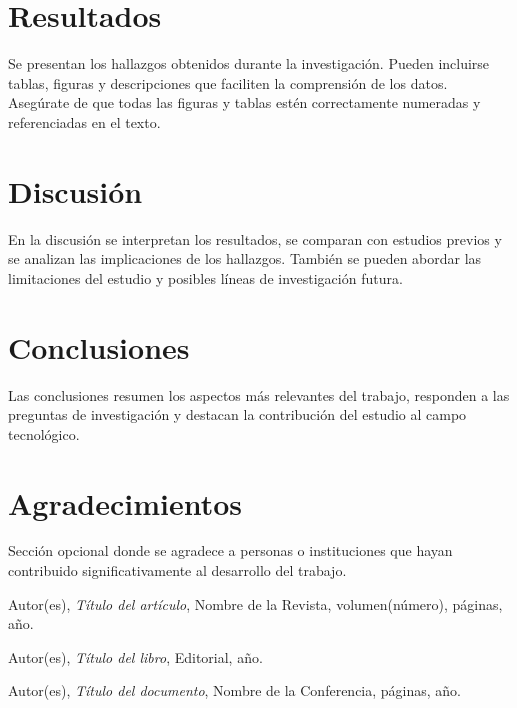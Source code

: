 \documentclass[a4paper,12pt]{article}
\begin{document}
\section{Resultados}
Se presentan los hallazgos obtenidos durante la investigación. Pueden incluirse tablas, figuras y descripciones que faciliten la comprensión de los datos. Asegúrate de que todas las figuras y tablas estén correctamente numeradas y referenciadas en el texto.

\section{Discusión}
En la discusión se interpretan los resultados, se comparan con estudios previos y se analizan las implicaciones de los hallazgos. También se pueden abordar las limitaciones del estudio y posibles líneas de investigación futura.

\section{Conclusiones}
Las conclusiones resumen los aspectos más relevantes del trabajo, responden a las preguntas de investigación y destacan la contribución del estudio al campo tecnológico.

\section{Agradecimientos}
Sección opcional donde se agradece a personas o instituciones que hayan contribuido significativamente al desarrollo del trabajo.

\begin{thebibliography}{99}
Autor(es), \emph{Título del artículo}, Nombre de la Revista, volumen(número), páginas, año.

Autor(es), \emph{Título del libro}, Editorial, año.

Autor(es), \emph{Título del documento}, Nombre de la Conferencia, páginas, año.
\end{thebibliography}
\end{document}
